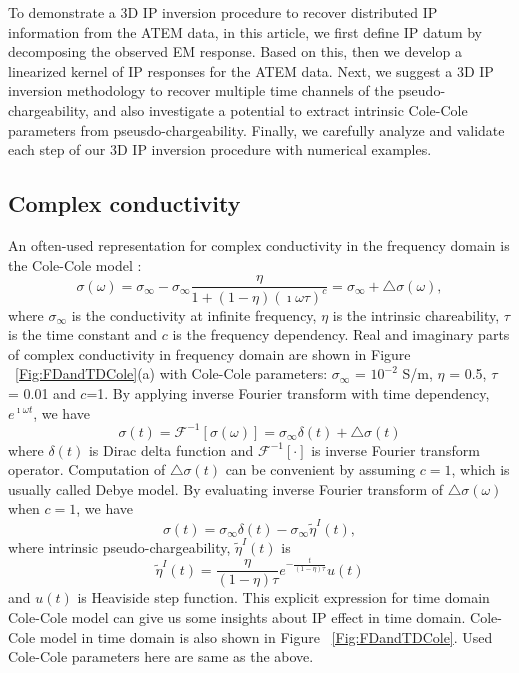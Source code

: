 \documentclass[a4paper, 11pt]{article}
\newcommand{\siginf}{\sigma_\infty}
\newcommand{\peta}{\tilde{\eta}}
\begin{document}
To demonstrate a 3D IP inversion procedure to recover distributed IP information from the ATEM data, in this article, we first define IP datum by decomposing the observed EM response. 
Based on this, then we develop a linearized kernel of IP responses for the ATEM data. 
Next, we suggest a 3D IP inversion methodology to recover multiple time channels of the pseudo-chargeability, and also investigate a potential to extract intrinsic Cole-Cole parameters from pseusdo-chargeability. Finally, we carefully analyze and validate each step of our 3D IP inversion procedure with numerical examples. 
      
    

\subsection{Complex conductivity}
An often-used representation for complex conductivity in the frequency domain is the Cole-Cole model \cite{COLE}:
\begin{equation}
  \sigma(\omega) = \sigma_{\infty} - \sigma_{\infty}\frac{\eta}{1+(1-\eta)(\imath\omega\tau)^c} = \sigma_{\infty} + \triangle\sigma(\omega),
  \label{eq: sigma_freq}
\end{equation}
where $\sigma_{\infty}$ is the conductivity at infinite frequency, $\eta$ is the intrinsic chareability, $\tau$ is the time constant and $c$ is the frequency dependency. Real and imaginary parts of complex conductivity in frequency domain are shown in Figure ~\ref{Fig:FDandTDCole}(a) with Cole-Cole parameters: $\siginf$ = $10^{-2}$ S/m, $\eta $ = 0.5, $\tau$ = 0.01 and $c$=1. By applying inverse Fourier transform with time dependency, $e^{\imath\omega t}$, we have
\begin{equation}
  \sigma(t) = \mathscr{F}^{-1}[\sigma(\omega)] = \sigma_{\infty}\delta(t) + \triangle\sigma(t)
  \label{eq: sigma_time}
\end{equation}
where $\delta(t)$ is Dirac delta function and $\mathscr{F}^{-1}[\cdot]$ is inverse Fourier transform operator. Computation of $\triangle\sigma(t)$ can be convenient by assuming $c=1$, which is usually called Debye model. By evaluating inverse Fourier transform of $\triangle\sigma(\omega)$ when $c=1$, we have
\begin{equation}
  \sigma(t) = \sigma_{\infty}\delta(t) - \siginf\peta^{I}(t),
  \label{eq: sigma_time_c1}
\end{equation}
where intrinsic pseudo-chargeability, $\peta^{I}(t)$ is
\begin{equation}
    \peta^{I}(t) = \frac{\eta}{(1-\eta)\tau}e^{-\frac{t}{(1-\eta)\tau}}u(t)
    \label{eq: intrinsic_peta}
\end{equation}
and $u(t)$ is Heaviside step function. This explicit expression for time domain Cole-Cole model can give us some insights about IP effect in time domain. Cole-Cole model in time domain is also shown in Figure ~\ref{Fig:FDandTDCole}. Used Cole-Cole parameters here are same as the above.
\end{document}
